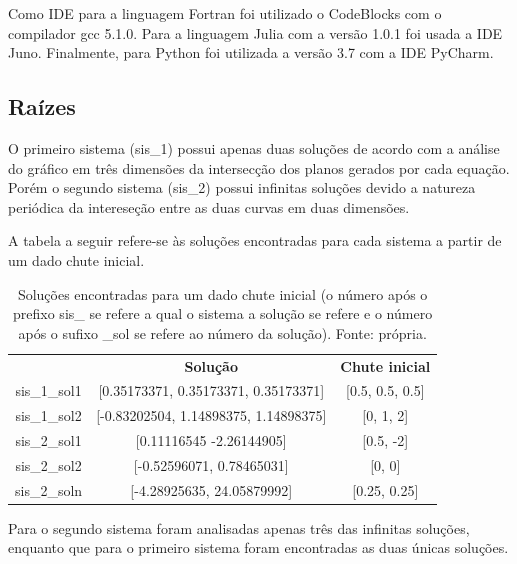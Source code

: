 \documentclass[a4paper, 12pt, openright, oneside]{article}
\begin{document}
Como IDE para a linguagem Fortran foi utilizado o CodeBlocks com o compilador gcc 5.1.0. Para a linguagem Julia com a versão 1.0.1 foi usada a IDE Juno. Finalmente, para Python foi utilizada a versão 3.7 com a IDE PyCharm.
  
\subsection{Raízes}

O primeiro sistema (sis\_1) possui apenas duas soluções de acordo com a análise do gráfico em três dimensões da intersecção dos planos gerados por cada equação. Porém o segundo sistema (sis\_2) possui infinitas soluções devido a natureza periódica da intereseção entre as duas curvas em duas dimensões. 

A tabela a seguir refere-se às soluções encontradas para cada sistema a partir de um dado chute inicial.

\begin{table}[htbp]
  \centering
  \caption{Soluções encontradas para um dado chute inicial (o número após o prefixo sis\_ se refere a qual o sistema a solução se refere e o número após o sufixo \_sol se refere ao número da solução). Fonte: própria.}
    \begin{tabular}{|c|c|c|}
\multicolumn{1}{c|}{} & \textbf{Solução} & \textbf{Chute inicial} \\

    sis\_1\_sol1 & [0.35173371, 0.35173371, 0.35173371]  & [0.5, 0.5, 0.5] \\

    sis\_1\_sol2 & [-0.83202504,  1.14898375,  1.14898375]  & [0, 1, 2] \\
 
    sis\_2\_sol1 & [0.11116545 -2.26144905]  & [0.5, -2] \\

    sis\_2\_sol2 & [-0.52596071,  0.78465031] & [0, 0] \\

    sis\_2\_soln & [-4.28925635, 24.05879992]  & [0.25, 0.25] \\

    \end{tabular}%
  \label{tab:addlabel}%
\end{table}%

Para o segundo sistema foram analisadas apenas três das infinitas soluções, enquanto que para o primeiro sistema foram encontradas as duas únicas soluções. 
\end{document}
